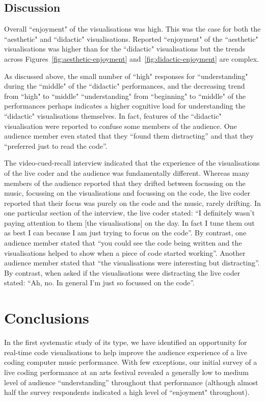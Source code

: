 \documentclass{sig-alternate}
\begin{document}
\subsection{Discussion}

Overall ``enjoyment" of the visualisations was high. This was the case for both the ``aesthetic" and ``didactic" visualisations.
Reported ``enjoyment" of the ``aesthetic" visualisations was higher than for the ``didactic" visualisations but the trends across Figures~\ref{fig:aesthetic-enjoyment} and~\ref{fig:didactic-enjoyment} are complex. 

As discussed above, the small number of ``high" responses for ``understanding" during the ``middle" of the ``didactic" performances, and the decreasing trend from ``high" to ``middle" ``understanding" from ``beginning" to ``middle" of the performances perhaps indicates a higher cognitive load for understanding the ``didactic" visualisations themselves. In fact, features of the ``didactic" visualisation were reported to confuse some members of the audience. One audience member even stated that they ``found them distracting'' and that they ``preferred just to read the code''.

The video-cued-recall interview indicated that the experience of the visualisations of the live coder and the  audience was fundamentally different. Whereas many members of the audience reported that they drifted between focussing on the music, focussing on the visualisations and focussing on the code, the live coder reported that their focus was  purely on the code and the music, rarely drifting. In one particular section of the interview, the live coder stated: ``I definitely wasn't paying attention to them [the visualisations] on the day. In fact I tune them out as best I can because I am just trying to focus on the code''. By contrast, one audience member stated that ``you could see the code being written and the visualisations helped to show when a piece of code started working''. Another audience member stated that ``the visualisations were interesting but distracting''. By contrast, when asked if the visualisations were distracting the live coder stated: ``Ah, no. In general I'm just so focussed on the code''. 

\section{Conclusions}

In the first systematic study of its type, we have identified an opportunity for real-time code visualisations to help improve the audience experience of a live coding computer music performance. With few exceptions, our initial survey of a live coding performance at an arts festival revealed a generally low to medium level of audience ``understanding'' throughout that performance (although almost half the survey respondents indicated a high level of ``enjoyment" throughout).
\end{document}
